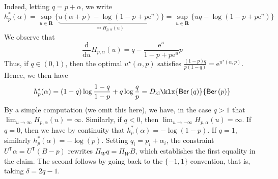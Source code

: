 \documentclass[11pt, letterpaper, hidelinks]{article}
\newcommand{\R}{\mathbf R}
\newcommand{\e}{\mathrm{e}}
\newcommand{\ud}[0]{\mathrm{d}}
\newcommand{\1}{\mathbf 1}
\newcommand{\T}{\mathsf{T}}
\newcommand{\kl}{D_{\rm kl}\klx}
\theoremstyle{plain}
\theoremstyle{definition}
\newcommand{\Ber}[1]{\mathsf{Ber}\left(#1\right)}
\begin{document}
Indeed, letting $q = p + \alpha$, we write 
    \[
    h_p^*(\alpha) = 
    \sup_{u \in \R} \Big\{\underbrace{
    u (\alpha + p) - \log(1 - p + p\e^{u})}_{\eqcolon H_{p, \alpha}(u)} 
    \Big\} = 
    \sup_{u \in \R} \Big\{
    u q - \log(1 - p + p\e^{u}) 
    \Big\}
    \]
    We observe that 
    \[
    \frac{\ud}{\ud u}
    H_{p,\alpha}(u) = q - \frac{\e^u}{1 - p + p\e^u} p
    \]
    Thus, if $q \in (0, 1)$, then the optimal $u^\star(\alpha, p)$ satisfies $\tfrac{(1-p)q}{p(1 - q)}=\e^{u^\star(\alpha, p)}$.
    Hence, we then have  
    \[
    h_p^*(\alpha) = 
    (1-q)\log \frac{1-q}{1-p} +
    q \log \frac{q}{p} 
    =
    \kl{\Ber{q}}{\Ber{p}}
    \]
    By a simple computation (we omit this here), we have, in the case $q > 1$ that $\lim_{u \to \infty} H_{p, \alpha}(u) = \infty$. 
    Similarly, if $q < 0$, then $\lim_{u \to -\infty} H_{p, \alpha}(u) = \infty$. If $q = 0$, then we have by continuity that $h_p^*(\alpha) = -\log(1-p)$. If $q = 1$, similarly $h_p^*(\alpha) = -\log(p)$. Setting $q_i = p_i+\alpha_i$, the constraint
$U^\T\alpha=U^\T(B-p)$ rewrites $\Pi_W q = \Pi_W B$, which establishes the first equality in the claim. The second follows by going back to the $\{-1,1\}$ convention, that is, taking $\delta = 2 q-1$.
\end{document}
